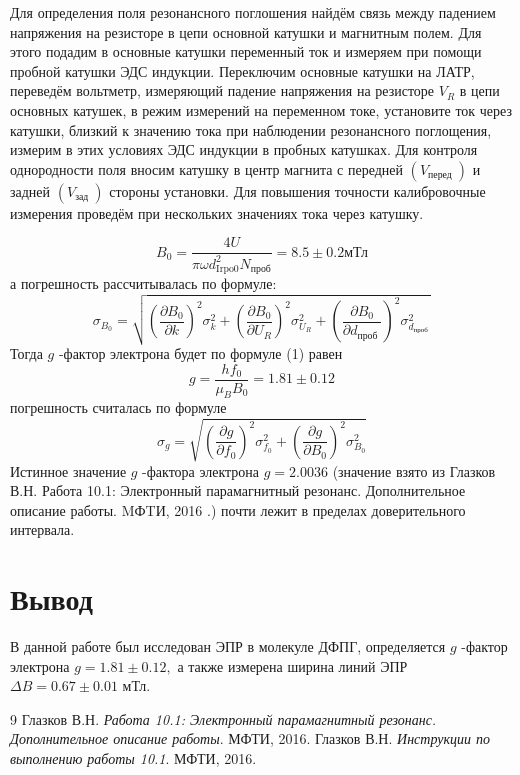 \documentclass[a4paper,12pt]{extarticle}
\begin{document}
Для определения поля резонансного поглошения найдём связь между падением напряжения на резисторе в цепи основной катушки и магнитным полем. Для этого подадим в основные катушки переменный ток и измеряем при помощи пробной катушки ЭДС индукции. Переключим основные катушки на ЛАТР, переведём вольтметр, измеряющий падение напряжения на резисторе $V_{R}$ в цепи основных катушек, в режим измерений на переменном токе, установите ток через катушки, близкий к значению тока при наблюдении резонансного поглощения, измерим в этих условиях ЭДС индукции в пробных катушках. Для контроля однородности поля вносим катушку в центр магнита с передней $\left(V_{\text {перед }}\right)$ и задней $\left(V_{\text {зад }}\right)$ стороны установки. Для повышения точности калибровочные измерения проведём при нескольких значениях тока через катушку.

$$
B_{0}=\frac{4 U}{\pi \omega d_{\mathrm{Irpo} 0}^{2} N_{\text{проб}}}=8.5 \pm 0.2 \text{мТл}
$$
а погрешность рассчитывалась по формуле:
$$
\sigma_{B_{0}}=\sqrt{\left(\frac{\partial B_{0}}{\partial k}\right)^{2} \sigma_{k}^{2}+\left(\frac{\partial B_{0}}{\partial U_{R}}\right)^{2} \sigma_{U_{R}}^{2}+\left(\frac{\partial B_{0}}{\partial d_{\text {проб }}}\right)^{2} \sigma_{d_{\text {проб }}}^{2}}
$$
Тогда $g$ -фактор электрона будет по формуле (1) равен
$$
g=\frac{h f_{0}}{\mu_{B} B_{0}}=1.81 \pm 0.12
$$
погрешность считалась по формуле
$$
\sigma_{g}=\sqrt{\left(\frac{\partial g}{\partial f_{0}}\right)^{2} \sigma_{f_{0}}^{2}+\left(\frac{\partial g}{\partial B_{0}}\right)^{2} \sigma_{B_{0}}^{2}}
$$
Истинное значение $g$ -фактора электрона $g=2.0036$ (значение взято из Глазков В.Н. Работа 10.1: Электронный парамагнитный резонанс. Дополнительное описание работы. MФTИ, 2016 .) почти лежит в пределах доверительного интервала.
\section*{Вывод}
В данной работе был исследован ЭПР в молекуле ДФПГ, определяется $g$ -фактор электрона $g=1.81 \pm 0.12,$ а также измерена ширина линий ЭПР $\Delta B=0.67 \pm 0.01$ мТл.

\begin{thebibliography}{9}
Глазков В.Н. 
\textit{Работа 10.1: Электронный парамагнитный резонанс.
Дополнительное описание работы}. 
МФТИ, 2016.
Глазков В.Н. 
\textit{Инструкции по выполнению работы 10.1}. 
МФТИ, 2016.
\end{thebibliography}
\end{document}
